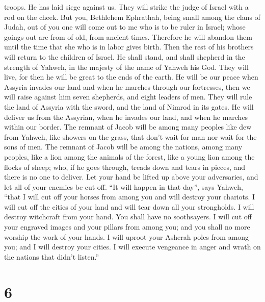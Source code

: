 troops. He has laid siege against us. They will strike the judge of
Israel with a rod on the cheek.  But you, Bethlehem
Ephrathah, being small among the clans of Judah, out of you one will
come out to me who is to be ruler in Israel; whose goings out are from
of old, from ancient times.  Therefore he will abandon
them until the time that she who is in labor gives birth. Then the rest
of his brothers will return to the children of Israel.  He
shall stand, and shall shepherd in the strength of Yahweh, in the
majesty of the name of Yahweh his God. They will live, for then he will
be great to the ends of the earth.  He will be our peace
when Assyria invades our land and when he marches through our
fortresses, then we will raise against him seven shepherds, and eight
leaders of men.  They will rule the land of Assyria with
the sword, and the land of Nimrod in its gates. He will deliver us from
the Assyrian, when he invades our land, and when he marches within our
border.  The remnant of Jacob will be among many peoples
like dew from Yahweh, like showers on the grass, that don't wait for man
nor wait for the sons of men.  The remnant of Jacob will
be among the nations, among many peoples, like a lion among the animals
of the forest, like a young lion among the flocks of sheep; who, if he
goes through, treads down and tears in pieces, and there is no one to
deliver.  Let your hand be lifted up above your
adversaries, and let all of your enemies be cut off. 
``It will happen in that day'', says Yahweh, ``that I will cut off your
horses from among you and will destroy your chariots.  I
will cut off the cities of your land and will tear down all your
strongholds.  I will destroy witchcraft from your hand.
You shall have no soothsayers.  I will cut off your
engraved images and your pillars from among you; and you shall no more
worship the work of your hands.  I will uproot your
Asherah poles from among you; and I will destroy your cities.
 I will execute vengeance in anger and wrath on the
nations that didn't listen.''

\hypertarget{section-4}{%
\section{6}\label{section-4}}

